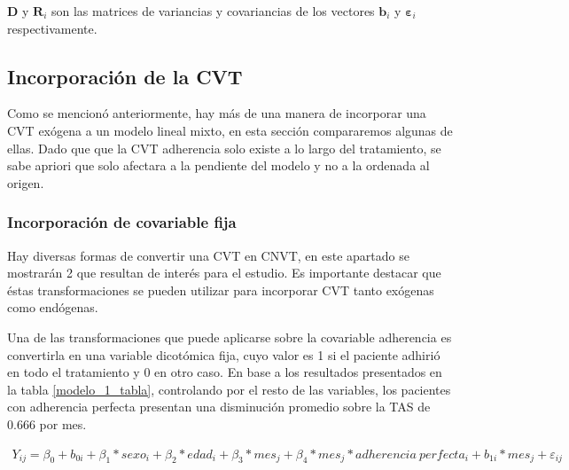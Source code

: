 \documentclass[spanish]{article}
\numberwithin{figure}{subsection}
\numberwithin{equation}{subsection}
\numberwithin{table}{subsection}
\begin{document}
$\bm{D}$ y $\bm{R}_i$ son las matrices de variancias y covariancias de los
vectores $\bm{b}_i$ y $\bm{\varepsilon}_i$ respectivamente.

\subsection{Incorporación de la CVT}

Como se mencionó anteriormente, hay más de una manera de incorporar una CVT
exógena a un modelo lineal mixto, en esta sección compararemos algunas de ellas.
Dado que que la CVT adherencia solo existe a lo largo del tratamiento, se sabe
apriori que solo afectara a la pendiente del modelo y no a la ordenada al
origen.

\subsubsection{Incorporación de covariable fija}

Hay diversas formas de convertir una CVT en CNVT, en este apartado se mostrarán
2 que resultan de interés para el estudio. Es importante destacar que éstas
transformaciones se pueden utilizar para incorporar CVT tanto exógenas como
endógenas.

Una de las transformaciones que puede aplicarse sobre la covariable adherencia
es convertirla en una variable dicotómica fija, cuyo valor es 1 si el paciente
adhirió en todo el tratamiento y 0 en otro caso. En base a los resultados
presentados en la tabla \ref{modelo_1_tabla}, controlando por el resto de las
variables, los pacientes con adherencia perfecta presentan una disminución
promedio sobre la TAS de 0.666 por mes.

\begin{multline}
	\label{modelo_1}
	Y_{ij} = \beta_0 + b_{0i} + \beta_1*sexo_i + \beta_2*edad_i +
	\beta_3*mes_j + \beta_4*mes_j*adherencia\ perfecta_i + b_{1i}*mes_j + \varepsilon_{ij}
\end{multline}
\end{document}
